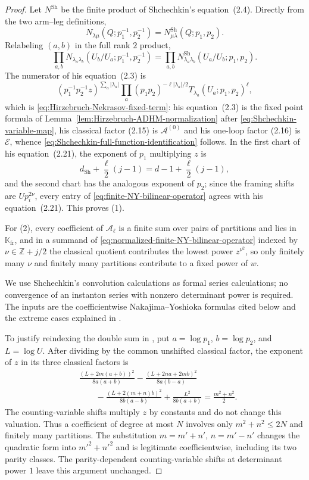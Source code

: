 \documentclass{amsart}
\theoremstyle{definition}
\numberwithin{equation}{section}
\newcommand{\Z}{\mathbb Z}
\newcommand{\K}{\mathbb K}
\begin{document}
\begin{proof}
Let \(N^{\mathrm{Sh}}\) be the finite product of Shchechkin's equation~(2.4).  Directly from the two arm--leg definitions,
\[
 N_{\lambda\mu}(Q;p_1^{-1},p_2^{-1})
 =N^{\mathrm{Sh}}_{\mu\lambda}(Q;p_1,p_2).
\]
Relabeling \((a,b)\) in the full rank \(2\) product,
\begin{equation}
 \prod_{a,b}N_{\lambda_a\lambda_b}
  (U_b/U_a;p_1^{-1},p_2^{-1})
 =\prod_{a,b}N^{\mathrm{Sh}}_{\lambda_a\lambda_b}
  (U_a/U_b;p_1,p_2).
\label{eq:Shchechkin-denominator-translation}
\end{equation}
The numerator of his equation~(2.3) is
\[
 (p_1^{-1}p_2^{-1}z)^{\sum_a|\lambda_a|}
 \prod_a(p_1p_2)^{-\ell|\lambda_a|/2}
 T_{\lambda_a}(U_a;p_1,p_2)^\ell,
\]
which is \eqref{eq:Hirzebruch-Nekrasov-fixed-term}: his equation~(2.3) is the fixed point formula of Lemma~\ref{lem:Hirzebruch-ADHM-normalization} after \eqref{eq:Shchechkin-variable-map}, his classical factor (2.15) is \(\mathcal A^{(0)}\) and his one-loop factor (2.16) is \(\mathcal E\), whence \eqref{eq:Shchechkin-full-function-identification} follows.  In the first chart of his equation~(2.21), the exponent of \(p_1\) multiplying \(z\) is
\[
 d_{\mathrm{Sh}}+\frac\ell2(j-1)
 =d-1+\frac\ell2(j-1),
\]
and the second chart has the analogous exponent of \(p_2\); since the framing shifts are \(Up_i^{2\nu}\), every entry of \eqref{eq:finite-NY-bilinear-operator} agrees with his equation~(2.21).  This proves (1).

For (2), every coefficient of \(\mathcal A_\ell\) is a finite sum over pairs of partitions and lies in \(\K_{\mathrm{fr}}\), and in a summand of \eqref{eq:normalized-finite-NY-bilinear-operator} indexed by \(\nu\in\Z+j/2\) the classical quotient contributes the lowest power \(z^{\nu^2}\), so only finitely many \(\nu\) and finitely many partitions contribute to a fixed power of \(w\).

We use Shchechkin's convolution calculations as formal series calculations; no convergence of an instanton series with nonzero determinant power is required.  The inputs are the coefficientwise Nakajima--Yoshioka formulas cited below and the extreme cases explained in \cite[footnote~6]{BershteinShchechkin}.

To justify reindexing the double sum in \cite[equations~(3.3)--(3.7)]{Shchechkin}, put \(a=\log p_1\), \(b=\log p_2\), and \(L=\log U\).  After dividing by the common unshifted classical factor, the exponent of \(z\) in its three classical factors is
\[
\begin{aligned}
 &\frac{(L+2m(a+b))^2}{8a(a+b)}
 -\frac{(L+2na+2mb)^2}{8a(b-a)}\\
 &\qquad-\frac{(L+2(m+n)b)^2}{8b(a-b)}
 +\frac{L^2}{8b(a+b)}
 =\frac{m^2+n^2}{2}.
\end{aligned}
\]
The counting-variable shifts multiply \(z\) by constants and do not change this valuation.  Thus a coefficient of degree at most \(N\) involves only \(m^2+n^2\leq2N\) and finitely many partitions.  The substitution \(m=m'+n'\), \(n=m'-n'\) changes the quadratic form into \(m'^2+n'^2\) and is legitimate coefficientwise, including its two parity classes.  The parity-dependent counting-variable shifts at determinant power \(1\) leave this argument unchanged.


\end{proof}
\end{document}

